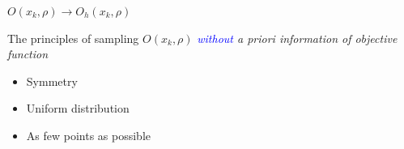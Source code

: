 \documentclass{beamer}
\DeclareMathOperator*{\argmin}{\mathrm{argmin}}
\begin{document}
%
%
%

\begin{frame}{$O(x_k, \rho)\rightarrow O_h(x_k, \rho)$}

The principles of sampling $O(x_k,\rho)$
\textit{\textcolor{blue}{without} a priori information of objective function}
\begin{itemize}
	\item Symmetry
	\item Uniform distribution
	\item As few points as possible
\end{itemize}

\end{frame}
\end{document}
